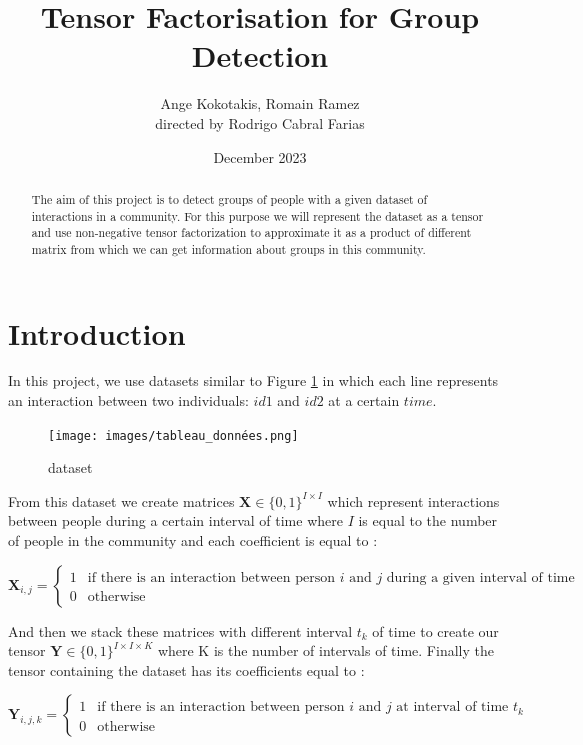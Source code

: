 \documentclass{article}
\title{Tensor Factorisation for Group Detection}
\author{ Ange Kokotakis, Romain Ramez \\ \small directed by Rodrigo Cabral Farias}
\date{December 2023}
\begin{document}
\maketitle

\begin{abstract}
    The aim of this project is to detect groups of people with a given dataset of interactions in a community.
    For this purpose we will represent the dataset as a tensor and use non-negative tensor factorization to approximate
    it as a product of different matrix from which we can get information about groups in this community.
\end{abstract}

\section{Introduction}

In this project, we use datasets similar to Figure \ref{dataset} in which each line represents an interaction between
two individuals: $id1$ and $id2$ at a certain $time$.

\begin{figure}[H]
    \centering
    \texttt{[image: images/tableau\_données.png]}
    \caption{dataset}
    \label{dataset}
\end{figure}

From this dataset we create matrices $\mathbf{X} \in \{0, 1\}^{I \times I}$ which represent interactions between people during a certain
interval of time where $I$ is equal to the number of people in the community and each coefficient is equal to :

\[
    \mathbf{X}_{i,j} = 
    \begin{cases}
        1 & \text{if there is an interaction between person $i$ and $j$ during a given interval of time} \\
        0 & \text{otherwise}
    \end{cases}
\]

And then we stack these matrices with different interval $t_k$ of time to create our tensor $\mathbf{Y} \in \{0, 1\}^{I \times I \times K}$
where K is the number of intervals of time. Finally the tensor containing the dataset has its coefficients equal to :

\[
    \mathbf{Y}_{i,j,k} = 
    \begin{cases}
        1 & \text{if there is an interaction between person $i$ and $j$ at interval of time $t_k$} \\
        0 & \text{otherwise}
    \end{cases}
\]
\end{document}
